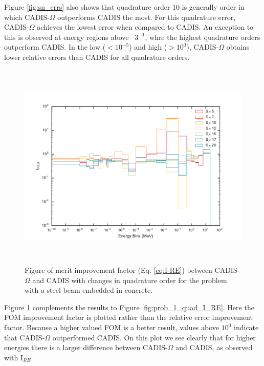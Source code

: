 Figure \ref{fig:sn_errs} also shows that quadrature order 10 is generally order
in which CADIS-$\Omega$ outperforms CADIS the most. For this quadrature error,
CADIS-$\Omega$ achieves the lowest error when compared to CADIS. An exception to
this is observed at energy regions above ~$3^{-1}$, whre the highest quadrature
orders outperform CADIS. In the low ($<10^{-5}$) and high ($>10^{0}$),
CADIS-$\Omega$ obtains lower relative errors than CADIS for all quadrature
orders.

\begin{figure}[h!]
  \centering
  \includegraphics[height=10cm]{./chapters/characterization_probs/figures/angle/prob_1/compare_fom_quad.pdf}
  \caption[Figure of merit improvement factor  (Eq. \eqref{eq:I-FOM}) between CADIS-$\Omega$ and
  CADIS with changes in quadrature order for steel beam embedded in concrete.]
  {Figure of merit improvement factor  (Eq. \eqref{eq:I-RE}) between CADIS-$\Omega$ and
   CADIS with changes in quadrature order for the problem with
   a steel beam embedded in concrete.}
  \label{fig:prob_1_quad_I_FOM}
\end{figure}

Figure \ref{fig:prob_1_quad_I_FOM} complements the results to Figure
\ref{fig:prob_1_quad_I_RE}. Here the FOM improvement factor is plotted rather
than the relative error improvement factor. Because a higher valued FOM is a
better result, values above $10^{0}$ indicate that CADIS-$\Omega$ outperformed
CADIS. On this plot we see clearly that for higher energies there is a
larger difference between CADIS-$\Omega$ and CADIS, as observed with I$_{RE}$.

